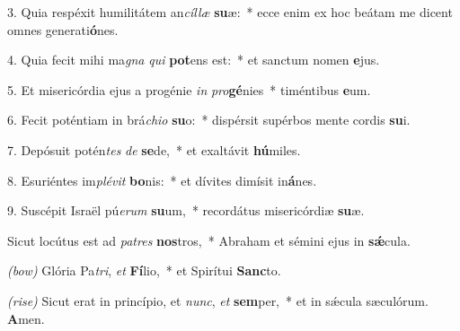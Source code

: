 3. Quia respéxit humilitátem an\textit{cíl}\textit{læ} \textbf{su}æ:~*
	ecce enim ex hoc beátam me dicent omnes generati\textbf{ó}nes.

4. Quia fecit mihi ma\textit{gna} \textit{qui} \textbf{pot}ens est:~*
	et sanctum nomen \textbf{e}jus.

5. Et misericórdia ejus a progénie \textit{in} \textit{pro}\textbf{gé}nies~*
	timéntibus \textbf{e}um.

6. Fecit poténtiam in brá\textit{chi}\textit{o} \textbf{su}o:~*
	dispérsit supérbos mente cordis \textbf{su}i.

7. Depósuit potén\textit{tes} \textit{de} \textbf{se}de,~*
	et exaltávit \textbf{hú}miles.

8. Esuriéntes im\textit{plé}\textit{vit} \textbf{bo}nis:~*
	et dívites dimísit in\textbf{á}nes.

9. Suscépit Israël pú\textit{e}\textit{rum} \textbf{su}um,~*
	recordátus misericórdiæ \textbf{su}æ.

Sicut locútus est ad \textit{pa}\textit{tres} \textbf{nos}tros,~*
	Abraham et sémini ejus in \textbf{s\'{\ae}}cula.

\textit{(bow)} Glória Pa\textit{tri}, \textit{et} \textbf{Fí}lio,~*
	et Spirítui \textbf{Sanc}to.

\textit{(rise)} Sicut erat in princípio, et \textit{nunc}, \textit{et} \textbf{sem}per,~*
	et in s\'{\ae}cula sæculórum. \textbf{A}men.